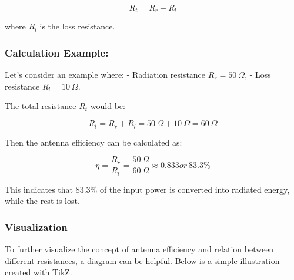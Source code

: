 \[
R_t = R_r + R_l
\]

where \(R_l\) is the loss resistance.

\subsubsection*{Calculation Example:}

Let’s consider an example where:
- Radiation resistance \(R_r = 50 \ \Omega\),
- Loss resistance \(R_l = 10 \ \Omega\).

The total resistance \(R_t\) would be:

\[
R_t = R_r + R_l = 50 \ \Omega + 10 \ \Omega = 60 \ \Omega
\]

Then the antenna efficiency can be calculated as:

\[
\eta = \frac{R_r}{R_t} = \frac{50 \ \Omega}{60 \ \Omega} \approx 0.833 or \ 83.3\%
\]

This indicates that 83.3\% of the input power is converted into radiated energy, while the rest is lost.

\subsubsection{Visualization}

To further visualize the concept of antenna efficiency and relation between different resistances, a diagram can be helpful. Below is a simple illustration created with TikZ.

\begin{center}
\end{center}
